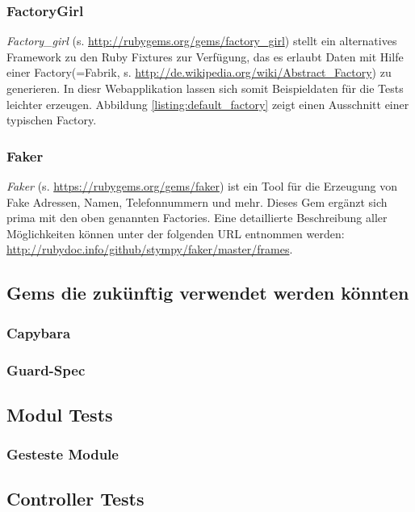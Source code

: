 \documentclass[12pt,             %
               a4paper,          %
               listof=totoc,     %
               index=totoc,      %
               bibliography=totoc,%
               oneside,         %
               BCOR1cm,          %
               english   %
               ]{scrbook}
\begin{document}
\subsubsection{FactoryGirl}
\textit{Factory\_girl} (s. \url{http://rubygems.org/gems/factory_girl}) stellt ein alternatives Framework zu den Ruby Fixtures zur Verfügung, das es erlaubt Daten mit Hilfe einer \glqq Factory\grqq (=Fabrik, s. \url{http://de.wikipedia.org/wiki/Abstract_Factory}) zu generieren. In diesr Webapplikation lassen sich somit Beispieldaten für die Tests leichter erzeugen. Abbildung \vref{listing:default_factory} zeigt einen Ausschnitt einer typischen Factory.  

\label{listing:default_factory}

\subsubsection{Faker}
\textit{Faker} (s. \url{https://rubygems.org/gems/faker}) ist ein Tool für die Erzeugung von Fake Adressen, Namen, Telefonnummern und mehr. Dieses Gem ergänzt sich prima mit den oben genannten Factories. Eine detaillierte Beschreibung aller Möglichkeiten können unter der folgenden URL entnommen werden: \url{http://rubydoc.info/github/stympy/faker/master/frames}.

\subsection{Gems die zukünftig verwendet werden könnten}
\subsubsection{Capybara}
\subsubsection{Guard-Spec}

\subsection{Modul Tests}
\subsubsection{Gesteste Module}
\subsection{Controller Tests}
\end{document}
